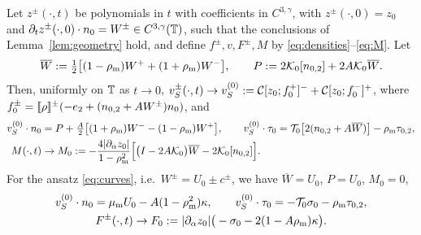 \begin{lemma}\label{lem:limits}
Let $z^\pm(\cdot,t)$ be polynomials in $t$ with coefficients in $C^{3,\gamma}$, with $z^\pm(\cdot,0)=z_0$ and $\partial_tz^\pm(\cdot,0)\cdot n_0=W^\pm\in C^{3,\gamma}(\mathbb{T})$, such that the conclusions of
Lemma~\ref{lem:geometry} hold, and define $f^\pm,v,F^\pm,M$ by \eqref{eq:densities}--\eqref{eq:M}. Let
\[
\overline W:=\tfrac12\big[(1-\rho_{\mathrm m})W^++(1+\rho_{\mathrm m})W^-\big],\qquad P:=2\mathcal{K}_0[n_{0,2}]+2A\mathcal{K}_0\overline W .
\]
Then, uniformly on $\mathbb{T}$ as $t\to0$, $v_S^\pm(\cdot,t)\to v_S^{(0)}:=\mathcal{C}[z_0;f_0^+]^-+\mathcal{C}[z_0;f_0^-]^+$, where $f_0^\pm=[\![\rho]\!]^\pm(-e_2+(n_{0,2}+AW^\pm)n_0)$, and
\begin{align}
v_S^{(0)}\cdot n_0&=P+\tfrac A2\big[(1+\rho_{\mathrm m})W^--(1-\rho_{\mathrm m})W^+\big],\qquad v_S^{(0)}\cdot\tau_0=\mathcal{T}_0\big[2(n_{0,2}+A\overline W)\big]-\rho_{\mathrm m}\tau_{0,2},\label{eq:vS0}\\
M(\cdot,t)&\to M_0:=-\frac{4|\partial_\alpha z_0|}{1-\rho_{\mathrm m}^2}\Big[\big(I-2A\mathcal{K}_0\big)\overline W-2\mathcal{K}_0[n_{0,2}]\Big].\label{eq:M0}
\end{align}
For the ansatz \eqref{eq:curves}, i.e.\ $W^\pm=U_0\pm c^\pm$, we have $\overline W=U_0$, $P=U_0$, $M_0=0$,
\begin{equation}\label{eq:F0}
\begin{gathered}
v_S^{(0)}\cdot n_0=\mu_{\mathrm m} U_0-A(1-\rho_{\mathrm m}^2)\kappa,\qquad v_S^{(0)}\cdot\tau_0=-\mathcal{T}_0\sigma_0-\rho_{\mathrm m}\tau_{0,2},\\
F^\pm(\cdot,t)\to F_0:=|\partial_\alpha z_0|\big(-\sigma_0-2(1-A\rho_{\mathrm m})\kappa\big).
\end{gathered}
\end{equation}
\end{lemma}

